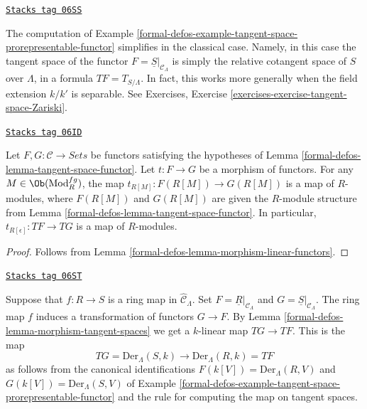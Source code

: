 \begin{example}
\label{formal-defos-example-tangent-space-classical-prorepresentable-functor}
\href{https://stacks.math.columbia.edu/tag/06SS}{\texttt{Stacks tag 06SS}}

The computation of
Example \ref{formal-defos-example-tangent-space-prorepresentable-functor}
simplifies in the classical case. Namely, in this case
the tangent space of the functor
$F = \underline{S}|_{\mathcal{C}_\Lambda}$ is simply the
relative cotangent space of $S$ over $\Lambda$, in a formula
$TF = T_{S/\Lambda}$. In fact, this works more generally when the
field extension $k/k'$ is separable. See
Exercises, Exercise \ref{exercises-exercise-tangent-space-Zariski}.
\end{example}

\begin{lemma}
\label{formal-defos-lemma-morphism-tangent-spaces}
\href{https://stacks.math.columbia.edu/tag/06ID}{\texttt{Stacks tag 06ID}}

Let $F, G: \mathcal{C} \to \textit{Sets}$ be functors satisfying
the hypotheses of
Lemma \ref{formal-defos-lemma-tangent-space-functor}.
Let $t : F \to G$ be a morphism of functors. For any
$M \in \Ob(\text{Mod}^{fg}_R)$, the map
$t_{R[M]}: F(R[M]) \to G(R[M])$ is a map of $R$-modules, where
$F(R[M])$ and $G(R[M])$ are given the $R$-module structure from
Lemma \ref{formal-defos-lemma-tangent-space-functor}.
In particular, $t_{R[\epsilon]} : TF \to TG$ is a map of $R$-modules.
\end{lemma}

\begin{proof}
Follows from
Lemma \ref{formal-defos-lemma-morphism-linear-functors}.
\end{proof}

\begin{example}
\label{formal-defos-example-tangent-space-map-prorepresentable-functor}
\href{https://stacks.math.columbia.edu/tag/06ST}{\texttt{Stacks tag 06ST}}

Suppose that $f : R \to S$ is a ring map in $\widehat{\mathcal{C}}_\Lambda$.
Set $F = \underline{R}|_{\mathcal{C}_\Lambda}$ and
$G = \underline{S}|_{\mathcal{C}_\Lambda}$. The ring map
$f$ induces a transformation of functors $G \to F$. By
Lemma \ref{formal-defos-lemma-morphism-tangent-spaces}
we get a $k$-linear map $TG \to TF$. This is the map
$$
TG = \text{Der}_\Lambda(S, k) \longrightarrow \text{Der}_\Lambda(R, k) = TF
$$
as follows from the canonical identifications
$F(k[V]) = \text{Der}_\Lambda(R, V)$ and
$G(k[V]) = \text{Der}_\Lambda(S, V)$ of
Example \ref{formal-defos-example-tangent-space-prorepresentable-functor}
and the rule for computing the map on tangent spaces.
\end{example}

